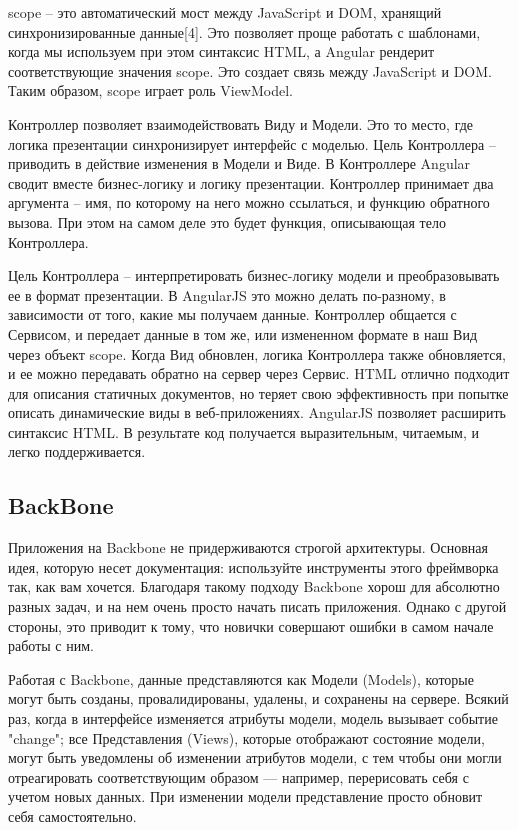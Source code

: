 \textdollar scope – это автоматический мост между JavaScript и DOM, хранящий синхронизированные данные[4]. Это позволяет проще работать с шаблонами, когда мы используем при этом синтаксис HTML, а Angular рендерит соответствующие значения \textdollar scope. Это создает связь между JavaScript и DOM. Таким образом, \textdollar scope играет роль ViewModel.

Контроллер позволяет взаимодействовать Виду и Модели. Это то место, где логика презентации синхронизирует интерфейс с моделью. Цель Контроллера – приводить в действие изменения в Модели и Виде. В Контроллере Angular сводит вместе бизнес-логику и логику презентации. Контроллер принимает два аргумента – имя, по которому на него можно ссылаться, и функцию обратного вызова. При этом на самом деле это будет функция, описывающая тело Контроллера.

Цель Контроллера – интерпретировать бизнес-логику модели и преобразовывать ее в формат презентации. В AngularJS это можно делать по-разному, в зависимости от того, какие мы получаем данные.
Контроллер общается с Сервисом, и передает данные в том же, или измененном формате в наш Вид через объект \textdollar scope. Когда Вид обновлен, логика Контроллера также обновляется, и ее можно передавать обратно на сервер через Сервис.
HTML отлично подходит для описания статичных документов, но теряет свою эффективность при попытке описать динамические виды в веб-приложениях. AngularJS позволяет расширить синтаксис HTML. В результате код получается выразительным, читаемым, и легко поддерживается.

\subsection {BackBone}

Приложения на Backbone не придерживаются строгой архитектуры. Основная идея, которую несет документация: используйте инструменты этого фреймворка так, как вам хочется. Благодаря такому подходу Backbone хорош для абсолютно разных задач, и на нем очень просто начать писать приложения. Однако с другой стороны, это приводит к тому, что новички совершают ошибки в самом начале работы с ним. 

Работая с Backbone, данные представляются как Модели (Models), которые могут быть созданы, провалидированы, удалены, и сохранены на сервере. Всякий раз, когда в интерфейсе изменяется атрибуты модели, модель вызывает событие "change"; все Представления (Views), которые отображают состояние модели, могут быть уведомлены об изменении атрибутов модели, с тем чтобы они могли отреагировать соответствующим образом — например, перерисовать себя с учетом новых данных. При изменении модели представление просто обновит себя самостоятельно.

